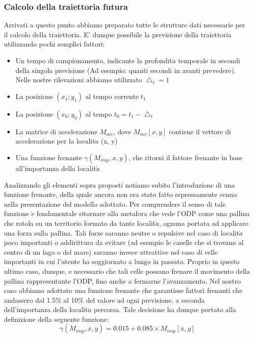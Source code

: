 \subsubsection{Calcolo della traiettoria futura}
Arrivati a questo punto abbiamo preparato tutte le strutture dati necessarie
per il calcolo della traiettoria. E' dunque possibile la previsione della traiettoria
utilizzando pochi semplici fattori:
\begin{itemize}
\item Un tempo di campionamento, indicante la profondit$\grave{a}$ temporale in secondi
della singola previsione (Ad esempio: quanti secondi in avanti
prevedere). Nelle nostre rilevazioni abbiamo utilizzato $\bigtriangleup_{t} = 1$
\item La posizione $(x_{1}; y_{1})$ al tempo corrente $t_{1}$
\item La posizione $(x_{0}; y_{0})$ al tempo $t_{0} = t_{1} - \bigtriangleup_{t}$
\item La matrice di accelerazione $M_{acc}$, dove $M_{acc}[x,y]$ contiene il vettore di
accelerazione per la localit$\grave{a}$ (x, y)
\item Una funzione frenante $\gamma(M_{imp},x,y)$, che ritorni il fattore frenante in base
all'importanza della localit$\grave{a}$
\end{itemize}
Analizzando gli elementi sopra proposti notiamo subito l'introduzione di
una funzione frenante, della quale ancora non era stato fatto espressamente
cenno nella presentazione del modello adottato. Per comprendere il senso di
tale funzione $\grave{e}$ fondamentale ritornare alla metafora che vede l'ODP come una
pallina che rotola su un territorio formato da tante localit$\grave{a}$, ognuna portata
ad applicare una forza sulla pallina. Tali forze saranno neutre o repulsive
nel caso di localit$\grave{a}$ poco importanti o addirittura da evitare (ad esempio le
caselle che si trovano al centro di un lago o del mare) saranno invece attrattive
nel caso di celle importanti in cui l'utente ha soggiornato a lungo in passato.
Proprio in questo ultimo caso, dunque, e necessario che tali celle possano
frenare il movimento della pallina rappresentante l'ODP, fino anche a fermarne
l'avanzamento.
Nel nostro caso abbiamo adottato una funzione frenante che garantisse
fattori frenanti che andassero dal 1.5\% al 10\% del valore ad ogni previsione,
a seconda dell'importanza della localit$\grave{a}$ percorsa. Tale decisione ha dunque
portato alla definizione della seguente funzione:
\begin{equation}
    \gamma(M_{imp},x,y) = 0.015 + 0.085 \times M_{imp}[x,y]
\end{equation}
